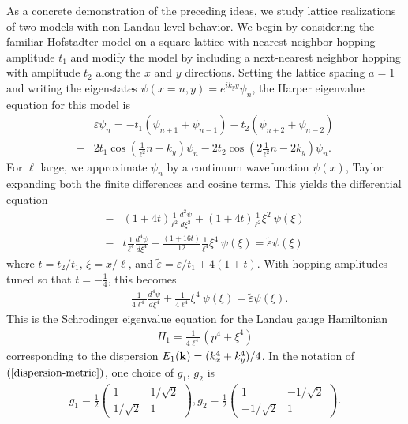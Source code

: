 \documentclass[aps,prb,twocolumn,letterpaper,twoside,nobalancelastpage,groupedaddress,amsmath,amssymb,floatfix,citeautoscript]{revtex4-1}
\begin{document}
As a concrete demonstration of the preceding ideas, we study lattice realizations of two models with non-Landau level behavior.
We begin by considering the familiar Hofstadter model on a square lattice with nearest neighbor hopping amplitude $t_1$ and modify the model by including a next-nearest neighbor hopping with amplitude $t_2$ along the $x$ and $y$ directions. Setting the lattice spacing $a=1$ and writing the eigenstates $\psi(x = n,y) = e^{i k_y y}\psi_n$, the Harper eigenvalue equation for this model is
\begin{align}
\label{equation-quartic-harper}
&\varepsilon \psi_{n} = -t_1\left(\psi_{n+1} + \psi_{n-1}\right)\nonumber - t_2\left(\psi_{n+2} + \psi_{n-2}\right)\\
 -&2t_1\cos\left(\frac{1}{\ell^2}n - k_{y}\right)\psi_n\nonumber 
  -2t_2\cos\left(2 \frac{1}{\ell^2}n - 2k_{y}\right)\psi_n.
\end{align}
For $\ell$ large, we approximate $\psi_n$ by a continuum wavefunction $\psi(x)$, Taylor expanding both the finite differences and cosine terms. This yields the differential equation
\begin{align*}
 -&(1 + 4t)\frac{1}{\ell^2}\frac{d^2 \psi}{d \xi^2} + (1 + 4t)\frac{1}{\ell^2}\xi^2~\psi(\xi)\\ - &t\frac{1}{\ell^4}\frac{d^4 \psi}{d \xi^4} -\frac{\left(1 + 16t\right)}{12}\frac{1}{\ell^4}\xi^4~\psi(\xi) =  \tilde{\varepsilon}\psi(\xi)
\end{align*}
where $t=t_2/t_1$, $\xi=x/\ell$, and $\tilde{\varepsilon} = \varepsilon/t_1 + 4(1+t)$. With hopping amplitudes tuned so that $t = -\frac{1}{4}$, this becomes
\begin{align*}
&\frac{1}{4\ell^4}\frac{d^4 \psi}{d \xi^4}  + \frac{1}{4\ell^4}\xi^4~\psi(\xi) =  \tilde{\varepsilon}\psi(\xi).
\end{align*}
This is the Schrodinger eigenvalue equation for the Landau gauge Hamiltonian 
\begin{align*}
H_1 = \frac{1}{4\ell^4}\left(p^4 + \xi^4\right)
\end{align*}
corresponding to the dispersion $E_1({\bf k}) = (k_x^4 + k_y^4)/4$. In the notation of $(\ref{dispersion-metric})$, one choice of $g_1$, $g_2$ is
\begin{align*}
g_1 = \frac{1}{2}\begin{pmatrix}1 &1/\sqrt{2}\\1/\sqrt{2} &1\end{pmatrix}, g_2 = \frac{1}{2}\begin{pmatrix}1 &-1/\sqrt{2}\\-1/\sqrt{2} &1\end{pmatrix}.
\end{align*}
\end{document}
